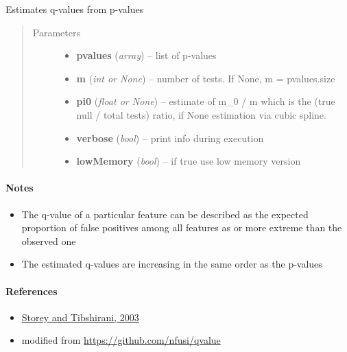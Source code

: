 \documentclass[letterpaper,10pt,english]{sphinxmanual}
\begin{document}

\begin{fulllineitems}
\label{api/ClearMap.Analysis.Tools:ClearMap.Analysis.Tools.MultipleComparisonCorrection.estimateQValues}
Estimates q-values from p-values
\begin{quote}\begin{description}
\item[{Parameters}] \leavevmode\begin{itemize}
\item {} 
\textbf{pvalues} (\emph{array}) --
list of p-values

\item {} 
\textbf{m} (\emph{int or None}) --
number of tests. If None, m = pvalues.size

\item {} 
\textbf{pi0} (\emph{float or None}) --
estimate of m\_0 / m which is the (true null / total tests) ratio, if None estimation via cubic spline.

\item {} 
\textbf{verbose} (\emph{bool}) --
print info during execution

\item {} 
\textbf{lowMemory} (\emph{bool}) --
if true use low memory version

\end{itemize}

\end{description}\end{quote}
\paragraph{Notes}
\begin{itemize}
\item {} 
The q-value of a particular feature can be described as the expected proportion of
false  positives  among  all  features  as  or  more  extreme  than  the observed one

\item {} 
The estimated q-values are increasing in the same order as the p-values

\end{itemize}
\paragraph{References}
\begin{itemize}
\item {} 
\href{http://www.pnas.org/content/100/16/9440.full}{Storey and Tibshirani, 2003}

\item {} 
modified from \href{https://github.com/nfusi/qvalue}{https://github.com/nfusi/qvalue}

\end{itemize}

\end{fulllineitems}
\end{document}

